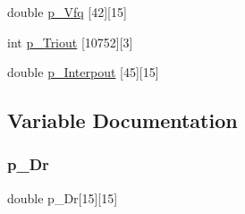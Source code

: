 \begin{DoxyCompactItemize}
\item 
double \hyperlink{a00455_a0eb27341e5fef6e91e1d23382d285028}{p\+\_\+\+Vfq} \mbox{[}42\mbox{]}\mbox{[}15\mbox{]}
\item 
int \hyperlink{a00455_a3ef5b63ec31667da8962def96159d10d}{p\+\_\+\+Triout} \mbox{[}10752\mbox{]}\mbox{[}3\mbox{]}
\item 
double \hyperlink{a00455_aa00db0695eea8a889149fe05db76d99a}{p\+\_\+\+Interpout} \mbox{[}45\mbox{]}\mbox{[}15\mbox{]}
\end{DoxyCompactItemize}


\subsection{Variable Documentation}
\mbox{\label{a00455_a2a8483d7a555fd078e93d9bfbcc47c68}} 
\subsubsection{\texorpdfstring{p\+\_\+\+Dr}{p\_Dr}}
{\footnotesize\ttfamily double p\+\_\+\+Dr\mbox{[}15\mbox{]}\mbox{[}15\mbox{]}}

